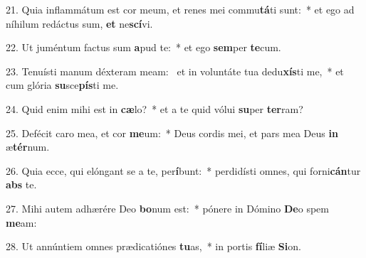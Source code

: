 21. Quia inflammátum est cor meum, et renes mei commu\textbf{tá}ti sunt:~*  et ego ad níhilum redáctus sum, \textbf{et} ne\textbf{scí}vi.\

22. Ut juméntum factus sum \textbf{a}pud te:~*  et ego \textbf{sem}per \textbf{te}cum.\

23. Tenuísti manum déxteram meam: \dag\  et in voluntáte tua dedu\textbf{xís}ti me,~*  et cum glória \textbf{su}sce\textbf{pís}ti me.\

24. Quid enim mihi est in \textbf{cæ}lo?~*  et a te quid vólui \textbf{su}per \textbf{ter}ram?\

25. Defécit caro mea, et cor \textbf{me}um:~*  Deus cordis mei, et pars mea Deus \textbf{in} æ\textbf{tér}num.\

26. Quia ecce, qui elóngant se a te, per\textbf{í}bunt:~*  perdidísti omnes, qui forni\textbf{cán}tur \textbf{abs} te.\

27. Mihi autem adhærére Deo \textbf{bo}num est:~*  pónere in Dómino \textbf{De}o spem \textbf{me}am:\

28. Ut annúntiem omnes prædicatiónes \textbf{tu}as,~*  in portis \textbf{fí}liæ \textbf{Si}on.\

